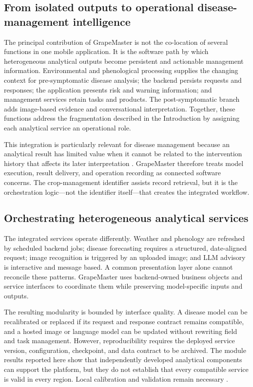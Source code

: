\documentclass[12pt]{article}
\begin{document}
\subsection{From isolated outputs to operational disease-management intelligence}\label{operational-disease-management-intelligence}

The principal contribution of GrapeMaster is not the co-location of several functions in one mobile application. It is the software path by which heterogeneous analytical outputs become persistent and actionable management information. Environmental and phenological processing supplies the changing context for pre-symptomatic disease analysis; the backend persists requests and responses; the application presents risk and warning information; and management services retain tasks and products. The post-symptomatic branch adds image-based evidence and conversational interpretation. Together, these functions address the fragmentation described in the Introduction by assigning each analytical service an operational role.

This integration is particularly relevant for disease management because an analytical result has limited value when it cannot be related to the intervention history that affects its later interpretation \citep{rossiAddressingImplementationProblem2014,rossiSharingDecisionmakingTools2023}. GrapeMaster therefore treats model execution, result delivery, and operation recording as connected software concerns. The crop-management identifier assists record retrieval, but it is the orchestration logic---not the identifier itself---that creates the integrated workflow.

\subsection{Orchestrating heterogeneous analytical services}\label{orchestrating-analytical-services}

The integrated services operate differently. Weather and phenology are refreshed by scheduled backend jobs; disease forecasting requires a structured, date-aligned request; image recognition is triggered by an uploaded image; and LLM advisory is interactive and message based. A common presentation layer alone cannot reconcile these patterns. GrapeMaster uses backend-owned business objects and service interfaces to coordinate them while preserving model-specific inputs and outputs.

The resulting modularity is bounded by interface quality. A disease model can be recalibrated or replaced if its request and response contract remains compatible, and a hosted image or language model can be updated without rewriting field and task management. However, reproducibility requires the deployed service version, configuration, checkpoint, and data contract to be archived. The module results reported here show that independently developed analytical components can support the platform, but they do not establish that every compatible service is valid in every region. Local calibration and validation remain necessary \citep{bregaglioPublicDecisionSupport2022}.
\end{document}

